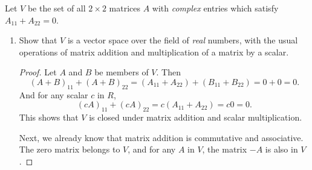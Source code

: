  Let $V$ be the set of all $2\times2$ matrices $A$ with
{\em complex} entries which satisfy $A_{11} + A_{22} = 0$.
\begin{enumerate}
\item Show that $V$ is a vector space over the field of {\em real}
  numbers, with the usual operations of matrix addition and
  multiplication of a matrix by a scalar.
  \begin{proof}
    Let $A$ and $B$ be members of $V$. Then
    \begin{equation*}
      (A+B)_{11} + (A+B)_{22}
      = (A_{11} + A_{22}) + (B_{11} + B_{22})
      = 0 + 0 = 0.
    \end{equation*}
    And for any scalar $c$ in $R$,
    \begin{equation*}
      (cA)_{11} + (cA)_{22} = c(A_{11} + A_{22}) = c0 = 0.
    \end{equation*}
    This shows that $V$ is closed under matrix addition and scalar
    multiplication.

    Next, we already know that matrix addition is commutative and
    associative. The zero matrix belongs to $V$, and for any $A$ in
    $V$, the matrix $-A$ is also in $V$.


\end{proof}
\end{enumerate}
